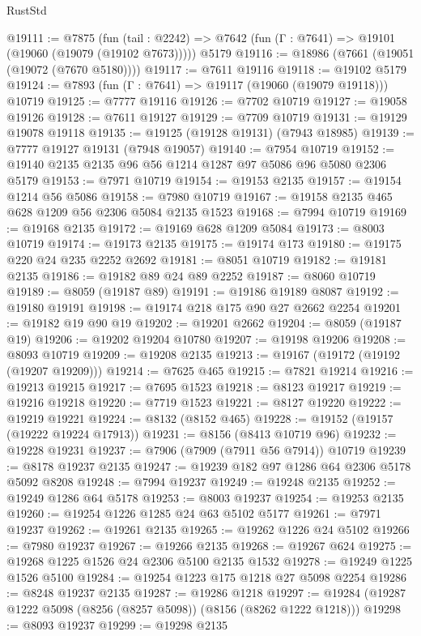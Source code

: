 \begin{lexlean}{RustStd}
\begin{coremodule}
{\begin{coremodule}
{{{{{{{{{{{{{{{{{{{{{{{{{{{{{{{{{{@19111 := @7875
    (fun (tail : @2242) => @7642 (fun (Γ : @7641) => @19101 (@19060 (@19079 (@19102 @7673)))))
    @5179
@19116 := @18986 (@7661 (@19051 (@19072 (@7670 @5180))))
@19117 := @7611 @19116
@19118 := @19102 @5179
@19124 := @7893 (fun (Γ : @7641) => @19117 (@19060 (@19079 @19118))) @10719
@19125 := @7777 @19116
@19126 := @7702 @10719
@19127 := @19058 @19126
@19128 := @7611 @19127
@19129 := @7709 @10719
@19131 := @19129 @19078 @19118
@19135 := @19125 (@19128 @19131) (@7943 @18985)
@19139 := @7777 @19127 @19131 (@7948 @19057)
@19140 := @7954 @10719
@19152 := @19140 @2135 @2135 @96 @56 @1214 @1287 @97 @5086 @96 @5080 @2306 @5179
@19153 := @7971 @10719
@19154 := @19153 @2135
@19157 := @19154 @1214 @56 @5086
@19158 := @7980 @10719
@19167 := @19158 @2135 @465 @628 @1209 @56 @2306 @5084 @2135 @1523
@19168 := @7994 @10719
@19169 := @19168 @2135
@19172 := @19169 @628 @1209 @5084
@19173 := @8003 @10719
@19174 := @19173 @2135
@19175 := @19174 @173
@19180 := @19175 @220 @24 @235 @2252 @2692
@19181 := @8051 @10719
@19182 := @19181 @2135
@19186 := @19182 @89 @24 @89 @2252
@19187 := @8060 @10719
@19189 := @8059 (@19187 @89)
@19191 := @19186 @19189 @8087
@19192 := @19180 @19191
@19198 := @19174 @218 @175 @90 @27 @2662 @2254
@19201 := @19182 @19 @90 @19
@19202 := @19201 @2662
@19204 := @8059 (@19187 @19)
@19206 := @19202 @19204 @10780
@19207 := @19198 @19206
@19208 := @8093 @10719
@19209 := @19208 @2135
@19213 := @19167 (@19172 (@19192 (@19207 @19209)))
@19214 := @7625 @465
@19215 := @7821 @19214
@19216 := @19213 @19215
@19217 := @7695 @1523
@19218 := @8123 @19217
@19219 := @19216 @19218
@19220 := @7719 @1523
@19221 := @8127 @19220
@19222 := @19219 @19221
@19224 := @8132 (@8152 @465)
@19228 := @19152 (@19157 (@19222 @19224 @17913))
@19231 := @8156 (@8413 @10719 @96)
@19232 := @19228 @19231
@19237 := @7906 (@7909 (@7911 @56 @7914)) @10719
@19239 := @8178 @19237 @2135
@19247 := @19239 @182 @97 @1286 @64 @2306 @5178 @5092 @8208
@19248 := @7994 @19237
@19249 := @19248 @2135
@19252 := @19249 @1286 @64 @5178
@19253 := @8003 @19237
@19254 := @19253 @2135
@19260 := @19254 @1226 @1285 @24 @63 @5102 @5177
@19261 := @7971 @19237
@19262 := @19261 @2135
@19265 := @19262 @1226 @24 @5102
@19266 := @7980 @19237
@19267 := @19266 @2135
@19268 := @19267 @624
@19275 := @19268 @1225 @1526 @24 @2306 @5100 @2135 @1532
@19278 := @19249 @1225 @1526 @5100
@19284 := @19254 @1223 @175 @1218 @27 @5098 @2254
@19286 := @8248 @19237 @2135
@19287 := @19286 @1218
@19297 := @19284 (@19287 @1222 @5098 (@8256 (@8257 @5098)) (@8156 (@8262 @1222 @1218)))
@19298 := @8093 @19237
@19299 := @19298 @2135
}}}}}}}}}}}}}}}}}}}}}}}}}}}}}}}}}}
\end{coremodule}}
\end{coremodule}
\end{lexlean}
